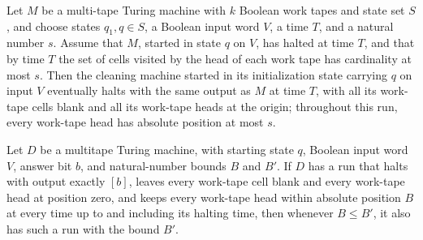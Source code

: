 \begin{theorem}
\label{Complexity.LogProg.cleanTM_run}
\leanok
{}
Let $M$ be a multi-tape Turing machine with $k$ Boolean work tapes and state set $S$,
and choose states $q_1,q\in S$, a Boolean input word $V$, a time $T$, and a natural
number $s$. Assume that $M$, started in state $q$ on $V$, has halted at time $T$, and
that by time $T$ the set of cells visited by the head of each work tape has cardinality
at most $s$. Then the cleaning machine started in its initialization state carrying $q$
on input $V$ eventually halts with the same output as $M$ at time $T$, with all its
work-tape cells blank and all its work-tape heads at the origin; throughout this run,
every work-tape head has absolute position at most $s$.
\end{theorem}

\begin{lemma}
\label{Complexity.LogProg.CleanRun.mono}
\leanok
{}
Let $D$ be a multitape Turing machine, with starting state $q$, Boolean input word $V$,
answer bit $b$, and natural-number bounds $B$ and $B'$. If $D$ has a run that halts with
output exactly $[b]$, leaves every work-tape cell blank and every work-tape head at
position zero, and keeps every work-tape head within absolute position $B$ at every time
up to and including its halting time, then whenever $B\le B'$, it also has such a run
with the bound $B'$.
\end{lemma}
